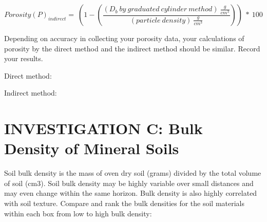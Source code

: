 \documentclass[
  letterpaper,
  twocolumn,
  portrait]{scrbook}
\begin{document}
\[
Porosity(P)_{indirect} =\ ({1 - (\frac{(D_{b}\ by\ graduated\ cylinder\ method)\ \frac{g}{cm^{3}}}{(particle\ density)\ \frac{g}{cm^{3}}})})\ *\ 100%
\]

Depending on accuracy in collecting your porosity data, your
calculations of porosity by the direct method and the indirect method
should be similar. Record your results.

Direct method:

Indirect method:

\hypertarget{investigation-c-bulk-density-of-mineral-soils}{%
\section{INVESTIGATION C: Bulk Density of Mineral
Soils}\label{investigation-c-bulk-density-of-mineral-soils}}

Soil bulk density is the mass of oven dry soil (grams) divided by the
total volume of soil (cm3). Soil bulk density may be highly variable
over small distances and may even change within the same horizon. Bulk
density is also highly correlated with soil texture. Compare and rank
the bulk densities for the soil materials within each box from low to
high bulk density:

 
  \providecommand{\huxb}[2]{\arrayrulecolor[RGB]{#1}\global\arrayrulewidth=#2pt}
  \providecommand{\huxvb}[2]{\color[RGB]{#1}\vrule width #2pt}
  \providecommand{\huxtpad}[1]{\rule{0pt}{#1}}
  \providecommand{\huxbpad}[1]{\rule[-#1]{0pt}{#1}}
\end{document}
